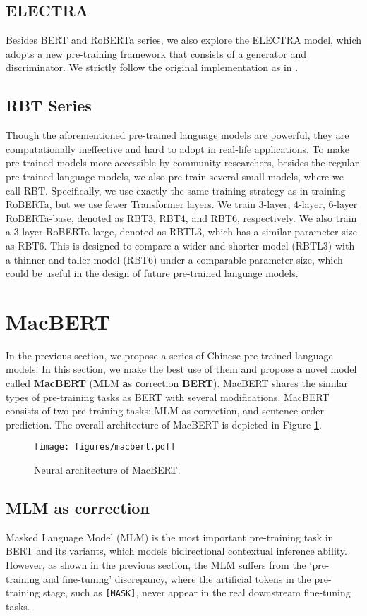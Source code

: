 \documentclass[journal]{IEEEtran}
\begin{document}
\begin{CJK*}{UTF8}{gbsn}
\subsection{ELECTRA}
Besides BERT and RoBERTa series, we also explore the ELECTRA model, which adopts a new pre-training framework that consists of a generator and discriminator.
We strictly follow the original implementation as in \cite{clark2020electra}.


\subsection{RBT Series}
Though the aforementioned pre-trained language models are powerful, they are computationally ineffective and hard to adopt in real-life applications.
To make pre-trained models more accessible by community researchers, besides the regular pre-trained language models, we also pre-train several small models, where we call RBT.
Specifically, we use exactly the same training strategy as in training RoBERTa, but we use fewer Transformer layers. 
We train 3-layer, 4-layer, 6-layer RoBERTa-base, denoted as RBT3, RBT4, and RBT6, respectively.
We also train a 3-layer RoBERTa-large, denoted as RBTL3, which has a similar parameter size as RBT6. 
This is designed to compare a wider and shorter model (RBTL3) with a thinner and taller model (RBT6) under a comparable parameter size, which could be useful in the design of future pre-trained language models.


\section{MacBERT}
In the previous section, we propose a series of Chinese pre-trained language models. 
In this section, we make the best use of them and propose a novel model called {\bf MacBERT} ({\bf M}LM {\bf a}s {\bf c}orrection {\bf BERT}).
MacBERT shares the similar types of pre-training tasks as BERT with several modifications.
MacBERT consists of two pre-training tasks: MLM as correction, and sentence order prediction.
The overall architecture of MacBERT is depicted in Figure \ref{macbert}.
\begin{figure}[h]
\centering
\texttt{[image: figures/macbert.pdf]} \\
\caption{\label{macbert} Neural architecture of MacBERT.}
\end{figure}


\subsection{MLM as correction}
Masked Language Model (MLM) is the most important pre-training task in BERT and its variants, which models bidirectional contextual inference ability.
However, as shown in the previous section, the MLM suffers from the `pre-training and fine-tuning' discrepancy, where the artificial tokens in the pre-training stage, such as {\tt [MASK]}, never appear in the real downstream fine-tuning tasks.


\end{CJK*}
\end{document}
